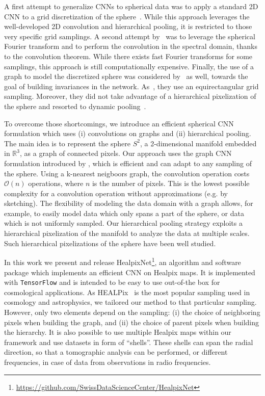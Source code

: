 \documentclass[final,twocolumn,3p,times,authoryear]{elsarticle}
\newcommand{\1}{\b{1}}              %
\newcommand{\0}{\b{0}}              %
\newcommand{\pkg}[1]{\texttt{#1}}
\begin{document}
A first attempt to generalize CNNs to spherical data was to apply a standard 2D CNN to a grid discretization of the sphere~\citep{boomsma2017spherical}. While this approach leverages the well-developed 2D convolution and hierarchical pooling, it is restricted to those very specific grid samplings.
A second attempt by~\citet{cohen2018spherical} was to leverage the spherical Fourier transform and to perform the convolution in the spectral domain, thanks to the convolution theorem. While there exists fast Fourier transforms for some samplings, this approach is still computationally expensive.
Finally, the use of a graph to model the discretized sphere was considered by~\citet{khasanova2017graph} as well, towards the goal of building invariances in the network. As~\citep{boomsma2017spherical}, they use an equirectangular grid sampling. Moreover, they did not take advantage of a hierarchical pixelization of the sphere and resorted to dynamic pooling~\citep{kalchbrenner2014dcnn}.

To overcome those shortcomings, we introduce an efficient spherical CNN formulation which uses (i) convolutions on graphs and (ii) hierarchical pooling. The main idea is to represent the sphere $S^2$, a 2-dimensional manifold embedded in $\mathbb{R}^3$, as a graph of connected pixels.
Our approach uses the graph CNN formulation introduced by \citet{defferrard2016convolutional}, which is efficient and can adapt to any sampling of the sphere. Using a k-nearest neigboors graph, the convolution operation costs $\mathcal{O}(n)$ operations, where $n$ is the number of pixels. This is the lowest possible complexity for a convolution operation without approximations (e.g. by sketching).
The flexibility of modeling the data domain with a graph allows, for example, to easily model data which only spans a part of the sphere, or data which is not uniformly sampled.
Our hierarchical pooling strategy exploits a hierarchical pixelization of the manifold to analyze the data at multiple scales.
Such hierarchical pixelizations of the sphere have been well studied.

In this work we present and release HealpixNet\footnote{\url{https://github.com/SwissDataScienceCenter/HealpixNet}}, an algorithm and software package which implements an efficient CNN on Healpix maps. It is implemented with \pkg{TensorFlow} \citep{abadi2016tensorflow} and is intended to be easy to use out-of-the box for cosmological applications.
As HEALPix~\citep{gorski2005healpix} is the most popular sampling used in cosmology and astrophysics, we tailored our method to that particular sampling. However, only two elements depend on the sampling: (i) the choice of neighboring pixels when building the graph, and (ii) the choice of parent pixels when building the hierarchy.
It is also possible to use multiple Healpix maps within our framework and use datasets in form of ``shells''. These shells can span the radial direction, so that a tomographic analysis can be performed, or different frequencies, in case of data from observations in radio frequencies.
\end{document}
